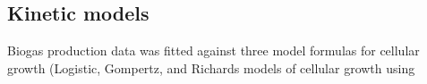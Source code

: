 \subsection{Kinetic models}
Biogas production data was fitted against three model formulas for cellular growth (Logistic, Gompertz, and
Richards models of cellular growth using  